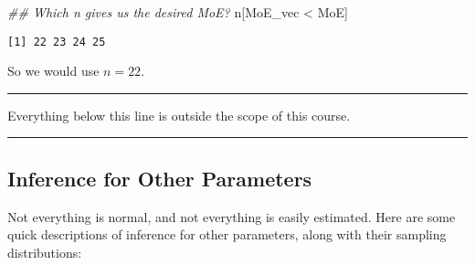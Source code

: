 \documentclass[
  letterpaper,
  DIV=11,
  numbers=noendperiod]{scrreprt}
\newenvironment{Shaded}{\begin{snugshade}}{\end{snugshade}}
\newcommand{\DocumentationTok}[1]{\textcolor[rgb]{0.37,0.37,0.37}{\textit{#1}}}
\newcommand{\NormalTok}[1]{\textcolor[rgb]{0.00,0.23,0.31}{#1}}
\newcommand{\SpecialCharTok}[1]{\textcolor[rgb]{0.37,0.37,0.37}{#1}}
\begin{document}
\begin{Shaded}
\begin{Highlighting}[]
\DocumentationTok{\#\# Which n gives us the desired MoE?}
\NormalTok{n[MoE\_vec }\SpecialCharTok{\textless{}}\NormalTok{ MoE]}
\end{Highlighting}
\end{Shaded}

\begin{verbatim}
[1] 22 23 24 25
\end{verbatim}

So we would use \(n = 22\).

\begin{center}\rule{0.5\linewidth}{0.5pt}\end{center}

Everything below this line is outside the scope of this course.

\begin{center}\rule{0.5\linewidth}{0.5pt}\end{center}

\hypertarget{inference-for-other-parameters}{%
\subsection{Inference for Other
Parameters}\label{inference-for-other-parameters}}

Not everything is normal, and not everything is easily estimated. Here
are some quick descriptions of inference for other parameters, along
with their sampling distributions:
\end{document}

